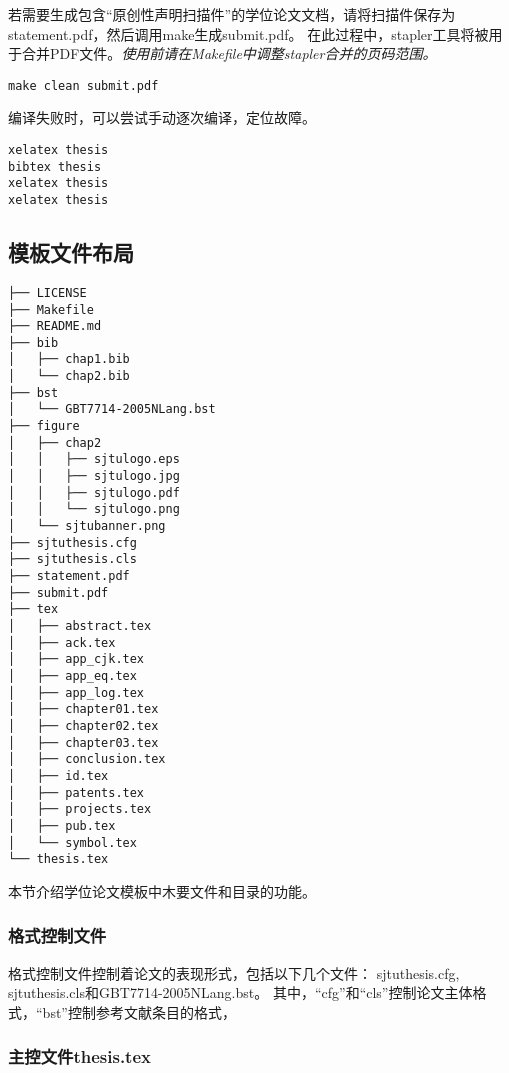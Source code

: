 若需要生成包含“原创性声明扫描件”的学位论文文档，请将扫描件保存为statement.pdf，然后调用make生成submit.pdf。
在此过程中，stapler工具将被用于合并PDF文件。\emph{使用前请在Makefile中调整stapler合并的页码范围。}

\begin{lstlisting}[basicstyle=\small\ttfamily, caption={生成用于提交的学位论文}, numbers=none]
make clean submit.pdf
\end{lstlisting}

编译失败时，可以尝试手动逐次编译，定位故障。

\begin{lstlisting}[basicstyle=\small\ttfamily, caption={手动逐次编译}, numbers=none]
xelatex thesis
bibtex thesis
xelatex thesis
xelatex thesis
\end{lstlisting}

\subsection{模板文件布局}
\label{sec:layout}

\begin{lstlisting}[basicstyle=\small\ttfamily,caption={模板文件布局},label=layout,float,numbers=none]
├── LICENSE
├── Makefile
├── README.md
├── bib
│   ├── chap1.bib
│   └── chap2.bib
├── bst
│   └── GBT7714-2005NLang.bst
├── figure
│   ├── chap2
│   │   ├── sjtulogo.eps
│   │   ├── sjtulogo.jpg
│   │   ├── sjtulogo.pdf
│   │   └── sjtulogo.png
│   └── sjtubanner.png
├── sjtuthesis.cfg
├── sjtuthesis.cls
├── statement.pdf
├── submit.pdf
├── tex
│   ├── abstract.tex
│   ├── ack.tex
│   ├── app_cjk.tex
│   ├── app_eq.tex
│   ├── app_log.tex
│   ├── chapter01.tex
│   ├── chapter02.tex
│   ├── chapter03.tex
│   ├── conclusion.tex
│   ├── id.tex
│   ├── patents.tex
│   ├── projects.tex
│   ├── pub.tex
│   └── symbol.tex
└── thesis.tex
\end{lstlisting}

本节介绍学位论文模板中木要文件和目录的功能。

\subsubsection{格式控制文件}
\label{sec:format}

格式控制文件控制着论文的表现形式，包括以下几个文件：
sjtuthesis.cfg, sjtuthesis.cls和GBT7714-2005NLang.bst。
其中，“cfg”和“cls”控制论文主体格式，“bst”控制参考文献条目的格式，

\subsubsection{主控文件thesis.tex}
\label{sec:thesistex}

